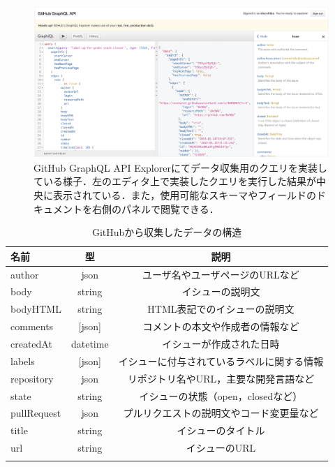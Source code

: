 \begin{figure}[tb]
    \centering
    \includegraphics[width=1.0\columnwidth]{GitHub_api_explorer.png}
    \caption{GitHub GraphQL API Explorerにてデータ収集用のクエリを実装している様子．左のエディタ上で実装したクエリを実行した結果が中央に表示されている．また，使用可能なスキーマやフィールドのドキュメントを右側のパネルで閲覧できる．}
    \label{fig:GitHub_api_explorer}
\end{figure}


\begin{table}[t]

  \centering
  \caption{GitHubから収集したデータの構造}
  \label{table:format_collected_GH_data}
    
  \begin{tabular}{l | c | c } \Xhline{3\arrayrulewidth}
      名前 & 型 & 説明 \\ \hline \hline
      author & json & ユーザ名やユーザページのURLなど\\
      body & string & イシューの説明文  \\
      bodyHTML & string & HTML表記でのイシューの説明文 \\
      comments & [json] & コメントの本文や作成者の情報など \\
      createdAt & datetime & イシューが作成された日時 \\
      labels & [json] & イシューに付与されているラベルに関する情報 \\
      repository & json & リポジトリ名やURL，主要な開発言語など\\  
      state & string & イシューの状態（open，closedなど） \\
      pullRequest & json & プルリクエストの説明文やコード変更量など \\
      title & string & イシューのタイトル \\
      url & string & イシューのURL \\
      
      \Xhline{3\arrayrulewidth}
  \end{tabular}
\end{table}

